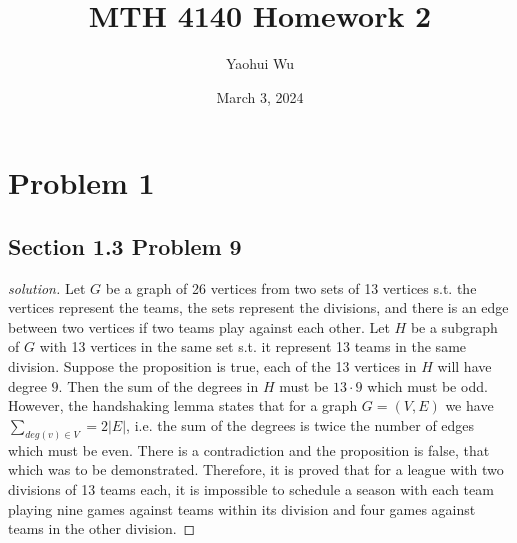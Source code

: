 \documentclass[12pt]{article}
\title{MTH 4140 Homework 2}
\author{Yaohui Wu}
\date{March 3, 2024}
\newenvironment*{solution}{\begin{proof}[solution]}{\end{proof}}
\begin{document}
\maketitle
\section*{Problem 1}
\subsection*{Section 1.3 Problem 9}
\begin{solution}
    Let \(G\) be a graph of 26 vertices from two sets of 13 vertices s.t. the
    vertices represent the teams, the sets represent the divisions, and there
    is an edge between two vertices if two teams play against each other. Let
    \(H\) be a subgraph of \(G\) with 13 vertices in the same set s.t. it
    represent 13 teams in the same division. Suppose the proposition is true,
    each of the 13 vertices in \(H\) will have degree \(9\). Then the sum of
    the degrees in \(H\) must be \(13\cdot9\) which must be odd. However, the
    handshaking lemma states that for a graph \(G=(V,E)\) we have \(\sum_{deg
    (v)\in V}=2|E|\), i.e. the sum of the degrees is twice the number of edges
    which must be even. There is a contradiction and the proposition is false,
    that which was to be demonstrated. Therefore, it is proved that for a
    league with two divisions of 13 teams each, it is impossible to schedule a
    season with each team playing nine games against teams within its division
    and four games against teams in the other division.
\end{solution}
\end{document}
